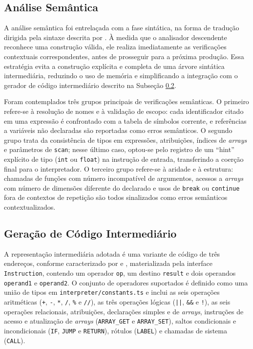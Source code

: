 \subsection{Análise Semântica}
\label{subsec:analise-semantica}

A análise semântica foi entrelaçada com a fase sintática, na forma de tradução dirigida pela sintaxe descrita por . À medida que o analisador descendente reconhece uma construção válida, ele realiza imediatamente as verificações contextuais correspondentes, antes de prosseguir para a próxima produção. Essa estratégia evita a construção explícita e completa de uma árvore sintática intermediária, reduzindo o uso de memória e simplificando a integração com o gerador de código intermediário descrito na Subseção \ref{subsec:geracao-codigo-intermediario}.

Foram contemplados três grupos principais de verificações semânticas. O primeiro refere-se à resolução de nomes e à validação de escopo: cada identificador citado em uma expressão é confrontado com a tabela de símbolos corrente, e referências a variáveis não declaradas são reportadas como erros semânticos. O segundo grupo trata da consistência de tipos em expressões, atribuições, índices de \textit{arrays} e parâmetros de \texttt{scan}; nesse último caso, optou-se pelo registro de um ``hint'' explícito de tipo (\texttt{int} ou \texttt{float}) na instrução de entrada, transferindo a coerção final para o interpretador. O terceiro grupo refere-se à aridade e à estrutura: chamadas de funções com número incompatível de argumentos, acessos a \textit{arrays} com número de dimensões diferente do declarado e usos de \texttt{break} ou \texttt{continue} fora de contextos de repetição são todos sinalizados como erros semânticos contextualizados.

\subsection{Geração de Código Intermediário}
\label{subsec:geracao-codigo-intermediario}

A representação intermediária adotada é uma variante de código de três endereços, conforme caracterizado por  e , materializada pela interface \texttt{Instruction}, contendo um operador \texttt{op}, um destino \texttt{result} e dois operandos \texttt{operand1} e \texttt{operand2}. O conjunto de operadores suportados é definido como uma união de tipos em \texttt{interpreter/constants.ts} e inclui as seis operações aritméticas (\texttt{+}, \texttt{-}, \texttt{*}, \texttt{/}, \texttt{\%} e \texttt{//}), as três operações lógicas (\texttt{||}, \texttt{\&\&} e \texttt{!}), as seis operações relacionais, atribuições, declarações simples e de \textit{arrays}, instruções de acesso e atualização de \textit{arrays} (\texttt{ARRAY\_GET} e \texttt{ARRAY\_SET}), saltos condicionais e incondicionais (\texttt{IF}, \texttt{JUMP} e \texttt{RETURN}), rótulos (\texttt{LABEL}) e chamadas de sistema (\texttt{CALL}).

